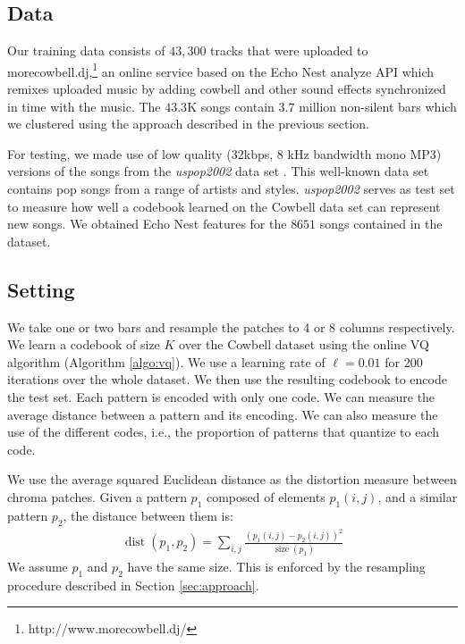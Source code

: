 \documentclass{article}
\DeclareMathOperator*{\dist}{dist}
\DeclareMathOperator*{\size}{size}
\newcommand{\ie}{i.e.~}
\begin{document}
\subsection{Data}
\label{sec:traindata}
\label{sec:testdata}
Our training data consists of $43,300$ tracks that were uploaded to
morecowbell.dj,\footnote{http://www.morecowbell.dj/} an online service
based on the Echo Nest analyze API which remixes uploaded music by
adding cowbell and other sound effects synchronized in time with the
music.  The $43.3$K songs contain $3.7$ million non-silent
bars which we clustered using the approach described in the previous
section.

For testing, we made use of low quality (32kbps, 8 kHz bandwidth mono MP3) versions of the songs
from the {\it uspop2002} data set \cite{uspop2002}.  This well-known data set 
contains pop songs from a range of artists and styles.
{\it uspop2002} serves as test set to measure how well a codebook learned on
the Cowbell data set can represent new songs.  We obtained Echo Nest features
for the $8651$ songs contained in the dataset.


\subsection{Setting}\label{ssec:setting}
We take one or two bars and resample the patches to 4 or 8 columns 
respectively.  We learn a codebook of size $K$ over the Cowbell
dataset using the online VQ algorithm (Algorithm \ref{algo:vq}). We use a
learning rate of $\ell=0.01$ for $200$ iterations over the whole
dataset.
%
We then use the resulting codebook to encode the test set.
Each pattern is encoded with only one code. We can measure the average
distance between a pattern and its encoding. We can also measure the use
of the different codes, 
i.e., the proportion of patterns that quantize to each code.

We use the average squared Euclidean distance as the distortion
measure between chroma patches.  Given a pattern $p_1$
composed of elements $p_1(i,j)$, and a similar pattern $p_2$, the
distance between them is:
\begin{eqnarray}
  \dist(p_1,p_2) = \sum_{i,j} \frac{(p_1(i,j) - p_2(i,j))^2}{\size(p_1)}
  \label{eq:dist}
\end{eqnarray}
We assume $p_1$ and $p_2$ have the same size.  This is enforced by the
resampling procedure described in Section \ref{sec:approach}.
\end{document}
